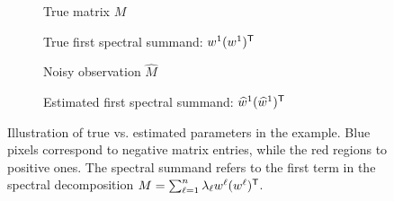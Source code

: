 \documentclass{notices}
\theoremstyle{definition}\newtheorem{problem}{Problem}
\begin{document}
\newpage 
\onecolumn




\begin{figure}[ht!]
    \centering
    \begin{subfigure}[b]{0.45\textwidth}
        \centering
        \caption{True  matrix $M$}
        \label{fig:sub1_matrix}
    \end{subfigure}
    \hfill
    \begin{subfigure}[b]{0.45\textwidth}
        \centering
        \caption{True first spectral summand: ${w}^1 ({w}^1)^{\mathsf{T}}$}
        \label{fig:sub2_matrix}
    \end{subfigure}
    \baselineskip
    \begin{subfigure}[b]{0.45\textwidth}
        \centering
        \caption{Noisy observation $\widehat{M}$}
        \label{fig:sub3_matrix}
    \end{subfigure}
    \hfill
    \begin{subfigure}[b]{0.45\textwidth}
        \centering
        \caption{Estimated first spectral summand: $\widehat{{w}}^1 (\widehat{{w}}^1)^{\mathsf{T}}$}
        \label{fig:sub4_matrix}
    \end{subfigure}
    \caption{Illustration of true vs. estimated parameters in the example. Blue pixels correspond to negative matrix entries, while the red regions to positive ones. The spectral summand refers to the first term in the spectral decomposition $M=\sum_{\ell=1}^n \lambda_\ell w^\ell (w^\ell)^{\mathsf{T}}$.}
  \label{fig:sampling_figure}
\end{figure}
\end{document}
